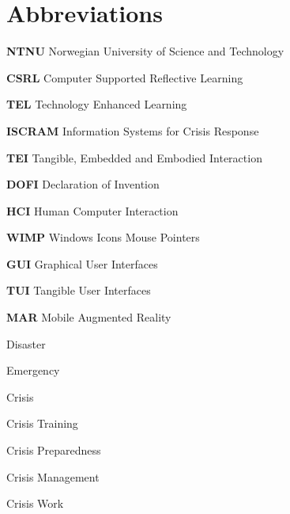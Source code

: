 \chapter{Abbreviations}\label{abbreviations}

\textbf{NTNU} Norwegian University of Science and Technology

\textbf{CSRL} Computer Supported Reflective Learning

\textbf{TEL} Technology Enhanced Learning

\textbf{ISCRAM} Information Systems for Crisis Response

\textbf{TEI} Tangible, Embedded and Embodied Interaction

\textbf{DOFI} Declaration of Invention

\textbf{HCI} Human Computer Interaction

\textbf{WIMP} Windows Icons Mouse Pointers

\textbf{GUI} Graphical User Interfaces

\textbf{TUI} Tangible User Interfaces

\textbf{MAR} Mobile Augmented Reality

Disaster

Emergency

Crisis

Crisis Training

Crisis Preparedness

Crisis Management

Crisis Work
